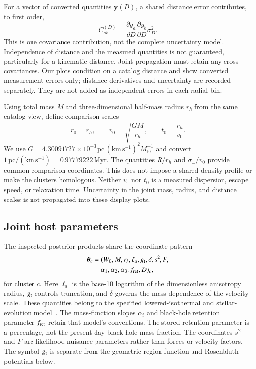 \documentclass[aps,prd,reprint,amsmath,amssymb,superscriptaddress,nofootinbib,longbibliography,floatfix]{revtex4-2}
\begin{document}
For a vector of converted quantities $\mathbf y(D)$, a shared distance error contributes, to first order,
\begin{equation}
C^{(D)}_{ab}=
\frac{\partial y_a}{\partial D}
\frac{\partial y_b}{\partial D}\sigma_D^2.
\label{eq:distance-covariance}
\end{equation}
This is one covariance contribution, not the complete uncertainty model. Independence of distance and the measured quantities is not guaranteed, particularly for a kinematic distance. Joint propagation must retain any cross-covariances. Our plots condition on a catalog distance and show converted measurement errors only; distance derivatives and uncertainty are recorded separately. They are not added as independent errors in each radial bin.

Using total mass $M$ and three-dimensional half-mass radius $r_h$ from the same catalog view, define comparison scales
\begin{equation}
r_0=r_h,\qquad v_0=\sqrt{\frac{GM}{r_h}},\qquad
t_0=\frac{r_h}{v_0}.
\label{eq:comparison-scales}
\end{equation}
We use $G=4.30091727\times10^{-3}\,\mathrm{pc}\,
(\mathrm{km\,s^{-1}})^2M_\odot^{-1}$ and convert
$1\,\mathrm{pc}/(\mathrm{km\,s^{-1}})=0.97779222\,\mathrm{Myr}$.
The quantities $R/r_h$ and $\sigma_\perp/v_0$ provide common comparison coordinates. This does not impose a shared density profile or make the clusters homologous. Neither $v_0$ nor $t_0$ is a measured dispersion, escape speed, or relaxation time. Uncertainty in the joint mass, radius, and distance scales is not propagated into these display plots.

\subsection{Joint host parameters}

The inspected posterior products share the coordinate pattern
\begin{align}
\boldsymbol\theta_c={}&(W_0,M,r_h,\ell_a,g_{\rm t},\delta,
s^2,F,\nonumber\\
&\alpha_1,\alpha_2,\alpha_3,f_{\rm ret},D)_c ,
\label{eq:host-coordinates}
\end{align}
for cluster $c$. Here $\ell_a$ is the base-10 logarithm of the dimensionless anisotropy radius, $g_{\rm t}$ controls truncation, and $\delta$ governs the mass dependence of the velocity scale. These quantities belong to the specified lowered-isothermal and stellar-evolution model~\cite{Gieles2015,Dickson2023}. The mass-function slopes $\alpha_i$ and black-hole retention parameter $f_{\rm ret}$ retain that model's conventions. The stored retention parameter is a percentage, not the present-day black-hole mass fraction. The coordinates $s^2$ and $F$ are likelihood nuisance parameters rather than forces or velocity factors. The symbol $g_{\rm t}$ is separate from the geometric region function and Rosenbluth potentials below.
\end{document}
